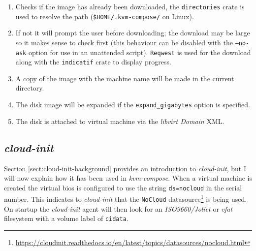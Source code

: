 \documentclass[
    author={Jacob Daniel Halsey},
    supervisor={Prof. Awais Rashid},
    degree={BSc},
    title={Building a Testbed for Evaluating Privacy Enhancing Technologies  (PETs)},
    subtitle={},
    type={software development},
    year={2021}
]{dissertation}
\begin{document}
\begin{singlespace}
	\begin{enumerate}
		\item Checks if the image has already been downloaded, the \texttt{directories} crate 
		is used to resolve the path (\texttt{\$HOME/.kvm-compose/} on Linux).
		\item If not it will prompt the user before downloading; the download may be large so it makes sense
		to check first (this behaviour can be disabled with the \texttt{--no-ask} option for use in
		an unattended script). \texttt{Reqwest} is used for the download along with the \texttt{indicatif}
		crate to display progress.
		\item A copy of the image with the machine name will be made in the current directory.
		\item The disk image will be expanded if the \texttt{expand\_gigabytes} option is specified.
		\item The disk is attached to virtual machine via the \emph{libvirt Domain} XML.
	\end{enumerate}
\end{singlespace}

\subsection{\emph{cloud-init}}
\label{sect:cloud-init-usage}

Section \ref{sect:cloud-init-background} provides an introduction to \emph{cloud-init}, but I
will now explain how it has been used in \emph{kvm-compose}.
When a virtual machine is created the virtual bios is configured to use the string
\texttt{ds=nocloud} in the serial number. This indicates to \emph{cloud-init} that 
the \texttt{NoCloud} datasource\footnote{\url{https://cloudinit.readthedocs.io/en/latest/topics/datasources/nocloud.html}}
is being used. On startup the \emph{cloud-init} agent will then look for an \emph{ISO9660/Joliet} or \emph{vfat}
filesystem with a volume label of \texttt{cidata}. \\
\end{document}
